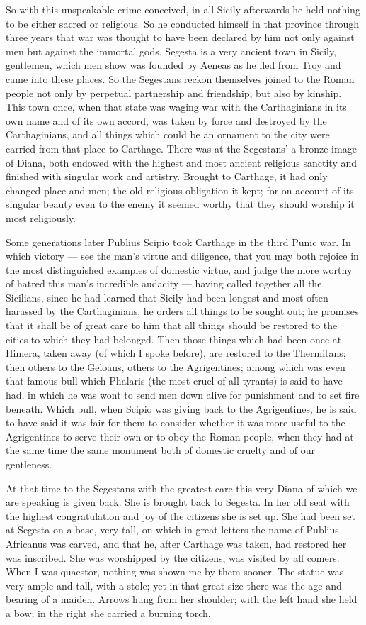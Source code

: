  So with this unspeakable crime conceived, in all Sicily afterwards he held nothing to be either sacred or religious. So he conducted himself in that province through three years that war was thought to have been declared by him not only against men but against the immortal gods. Segesta is a very ancient town in Sicily, gentlemen, which men show was founded by Aeneas as he fled from Troy and came into these places. So the Segestans reckon themselves joined to the Roman people not only by perpetual partnership and friendship, but also by kinship. This town once, when that state was waging war with the Carthaginians in its own name and of its own accord, was taken by force and destroyed by the Carthaginians, and all things which could be an ornament to the city were carried from that place to Carthage. There was at the Segestans' a bronze image of Diana, both endowed with the highest and most ancient religious sanctity and finished with singular work and artistry. Brought to Carthage, it had only changed place and men; the old religious obligation it kept; for on account of its singular beauty even to the enemy it seemed worthy that they should worship it most religiously.

 Some generations later Publius Scipio took Carthage in the third Punic war. In which victory --- see the man's virtue and diligence, that you may both rejoice in the most distinguished examples of domestic virtue, and judge the more worthy of hatred this man's incredible audacity --- having called together all the Sicilians, since he had learned that Sicily had been longest and most often harassed by the Carthaginians, he orders all things to be sought out; he promises that it shall be of great care to him that all things should be restored to the cities to which they had belonged. Then those things which had been once at Himera, taken away (of which I spoke before), are restored to the Thermitans; then others to the Geloans, others to the Agrigentines; among which was even that famous bull which Phalaris (the most cruel of all tyrants) is said to have had, in which he was wont to send men down alive for punishment and to set fire beneath. Which bull, when Scipio was giving back to the Agrigentines, he is said to have said it was fair for them to consider whether it was more useful to the Agrigentines to serve their own or to obey the Roman people, when they had at the same time the same monument both of domestic cruelty and of our gentleness.

 At that time to the Segestans with the greatest care this very Diana of which we are speaking is given back. She is brought back to Segesta. In her old seat with the highest congratulation and joy of the citizens she is set up. She had been set at Segesta on a base, very tall, on which in great letters the name of Publius Africanus was carved, and that he, after Carthage was taken, had restored her was inscribed. She was worshipped by the citizens, was visited by all comers. When I was quaestor, nothing was shown me by them sooner. The statue was very ample and tall, with a stole; yet in that great size there was the age and bearing of a maiden. Arrows hung from her shoulder; with the left hand she held a bow; in the right she carried a burning torch.

